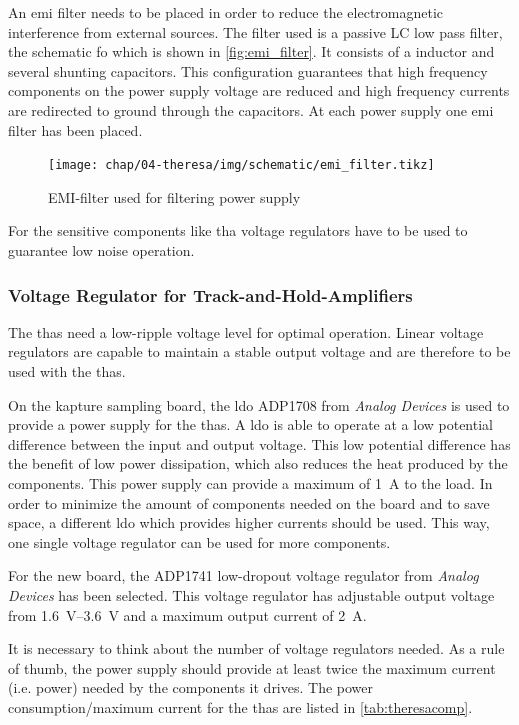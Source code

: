 An \gls{emi} filter needs to be placed in order to reduce the electromagnetic interference from external sources. 
The filter used is a passive LC low pass filter, the schematic fo which is shown in \autoref{fig:emi_filter}.
It consists of a inductor and several shunting capacitors.
This configuration guarantees that high frequency components on the power supply voltage are reduced and high frequency currents are redirected to ground through the capacitors.
At each power supply one \gls{emi} filter has been placed. 
\begin{figure}[tb]
	\centering
	\texttt{[image: chap/04-theresa/img/schematic/emi\_filter.tikz]}
	\caption{EMI-filter used for filtering power supply}
	\label{fig:emi_filter}
\end{figure}
For the sensitive components like \gls{tha} voltage regulators have to be used to guarantee low noise operation.


\subsubsection*{Voltage Regulator for Track-and-Hold-Amplifiers}
The \glspl{tha} need a low-ripple voltage level for optimal operation. 
Linear voltage regulators are capable to maintain a stable output voltage and are therefore to be used with the \glspl{tha}.

On the \gls{kapture} sampling board, the \gls{ldo} ADP1708 from \textit{Analog Devices} is used to provide a power supply for the \glspl{tha}. 
A \gls{ldo} is able to operate at a low potential difference between the input and output voltage. 
This low potential difference has the benefit of low power dissipation, which also reduces the heat produced by the components.  
This power supply can provide a maximum of \SI{1}{\ampere} to the load. 
In order to minimize the amount of components needed on the board and to save space, a different \gls{ldo} which provides higher currents should be used. 
This way, one single voltage regulator can be used for more components.

For the new board, the ADP1741 low-dropout voltage regulator from \textit{Analog Devices} has been selected. This voltage regulator has adjustable output voltage from \SIrange{1.6}{3.6}{\volt} and a maximum output current of \SI{2}{\ampere}. 

It is necessary to think about the number of voltage regulators needed. As a rule of thumb, the power supply should provide at least twice the maximum current (i.e. power) needed by the components it drives. \cite{michele} The power consumption/maximum current for the \glspl{tha} are listed in \autoref{tab:theresacomp}. 

